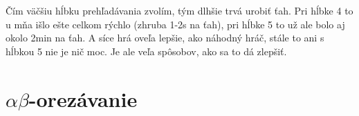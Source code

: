 Čím väčšiu hĺbku prehľadávania zvolím, tým dlhšie trvá urobiť ťah. Pri hĺbke 4
to u mňa išlo ešte celkom rýchlo (zhruba 1-2s na ťah), pri hĺbke 5 to už ale bolo aj
okolo 2min na ťah.  A síce hrá oveľa lepšie, ako náhodný hráč, stále to ani s
hĺbkou 5 nie je nič moc. Je ale veľa spôsobov, ako sa to dá zlepšiť. 

\section*{$\alpha\beta$-orezávanie}
           
           \def\Biglist{
            1.5/{2,4,2,2,3,2,2,2,3,2,3,2,2,4,3,2,3,3,2,2,3,2,3,2}, 
            3/{2,2,2,2,2,3,5,2,2,2}, 
            4/{3,5,2},
            5/{3}}
\def\crossnode(#1){\begin{scope}[shift={(#1)}]\filldraw[fill=white](-0.5,-0.5)rectangle(0.5,0.5);\begin{scope}[shift={(-0.5,-0.5)}]\cross(0,2)\end{scope}\end{scope}}
\def\noughtnode(#1){\begin{scope}[shift={(#1)}]\filldraw[fill=white](-0.5,-0.5)rectangle(0.5,0.5);\begin{scope}[shift={(-0.5,-0.5)}]\nought(0,2)\end{scope}\end{scope}}

       \def\coords{
          \foreach \v in {1,...,60 } 
            \coordinate(p0x\v) at (\v,0);
          \foreach \h/\list[count=\lev] in \Biglist{
           \gdef\l{1}
           \foreach \d[count = \cnt] in \list {
             \pgfmathtruncatemacro{\r}{\l+\d-1}
             \pgfmathtruncatemacro{\prevlev}{\lev-1}
             \coordinate(p\lev x\cnt) at ($(p\prevlev x\l)!0.5!(p\prevlev x\r) + (0,\h)$);
             \pgfmathtruncatemacro{\r}{\r+1}
             \xdef\l{\r}
           }
         }
       }

       \def\base[#1]{
          \gdef\y{0}
          \foreach\h in {1.5, 3, 4, 5} {
            \pgfmathsetmacro{\tmp}{\y+\h}
            \xdef\y{\tmp}
            \draw[gray!60,dotted](1,\y) -- (60,\y);
          }
          \foreach \h/\list[count=\lev] in \Biglist{
           \gdef\l{1}
           \foreach \d[count = \cnt] in \list {
             \pgfmathtruncatemacro{\r}{\l+\d-1}
             \pgfmathtruncatemacro{\prevlev}{\lev-1}
             \filldraw[#1](p\lev x\cnt) circle (0.1);
             \foreach \i in {1,...,\d} {
               \pgfmathtruncatemacro{\tmp}{\l+\i-1}
               \draw[#1] (p\lev x\cnt) -- (p\prevlev x\tmp);
             }
             \pgfmathtruncatemacro{\r}{\r+1}
             \xdef\l{\r}
           }
         }
       }

